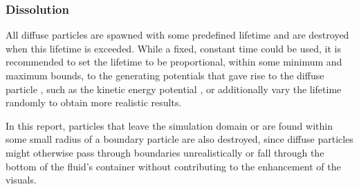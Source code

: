 \documentclass[oneside, a4paper]{book}
\begin{document}
  \subsubsection{Dissolution}
  All diffuse particles are spawned with some predefined lifetime and are destroyed when this lifetime is exceeded. While a fixed, constant time could be used, it is recommended to set the lifetime to be proportional, within some minimum and maximum bounds, to the generating potentials that gave rise to the diffuse particle \autocite{spray-foam-bubbles}, such as the kinetic energy potential \autocite{turbulent-micropolar-foam}, or additionally vary the lifetime randomly \autocite{turbulent-micropolar-foam} to obtain more realistic results.

  In this report, particles that leave the simulation domain or are found within some small radius of a boundary particle are also destroyed, since diffuse particles might otherwise pass through boundaries unrealistically or fall through the bottom of the fluid's container without contributing to the enhancement of the visuals.
\end{document}
